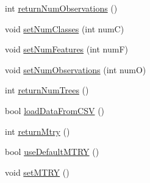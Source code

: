 \begin{DoxyCompactItemize}
int \hyperlink{classfp_1_1fpInfo_a5d70dfbd1f8dc26dbd8f066e210cf165}{return\+Num\+Observations} ()
\item 
void \hyperlink{classfp_1_1fpInfo_a3598d1ab13bf05b53858b1ca8c44fa68}{set\+Num\+Classes} (int numC)
\item 
void \hyperlink{classfp_1_1fpInfo_a69ef99f2ec9ef74dd3787bc33ffb05d0}{set\+Num\+Features} (int numF)
\item 
void \hyperlink{classfp_1_1fpInfo_ad17492e79df7bca55d98438fec2f004b}{set\+Num\+Observations} (int numO)
\item 
int \hyperlink{classfp_1_1fpInfo_a12d3d4b2216f37daf6555f07148c4f85}{return\+Num\+Trees} ()
\item 
bool \hyperlink{classfp_1_1fpInfo_a2a6ac3cfea5db5842baa1789468492ad}{load\+Data\+From\+C\+SV} ()
\item 
int \hyperlink{classfp_1_1fpInfo_a058477c4f05818c220efa469b7b630bb}{return\+Mtry} ()
\item 
bool \hyperlink{classfp_1_1fpInfo_a0a00d3d54cef667000249202a2d768bf}{use\+Default\+M\+T\+RY} ()
\item 
void \hyperlink{classfp_1_1fpInfo_a6b2a54fb9b3672e7b1bab3474a0ca33f}{set\+M\+T\+RY} ()
\end{DoxyCompactItemize}
